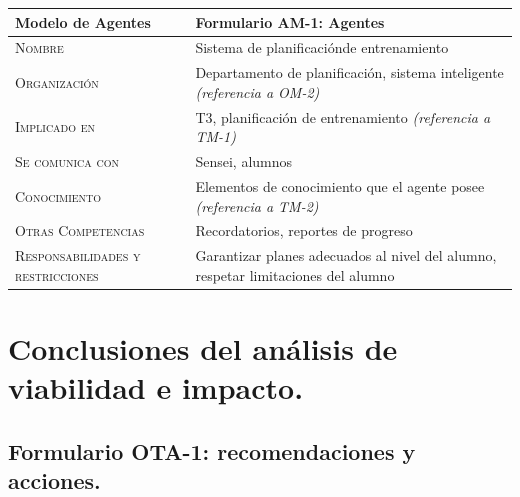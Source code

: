 \documentclass[12pt,a4paper,twoside,spanish]{article}      %
\begin{document}
        \begin{table}[H]
            \scriptsize
            \begin{tabularx}{\textwidth}{|l|X|} \hline
                \textbf{Modelo de Agentes} & \textbf{Formulario AM-1: Agentes} \\ \hline\hline
                
                \textsc{Nombre} &  Sistema de planificaciónde entrenamiento \\ \hline
                
                \textsc{Organización} &  Departamento de planificación, sistema inteligente \emph{(referencia a OM-2)}\\ \hline
                
                \textsc{Implicado en} & T3, planificación de entrenamiento \emph{(referencia a TM-1)} \\ \hline
                
                \textsc{Se comunica con} &  Sensei, alumnos  \\ \hline
                
                \textsc{Conocimiento} &  Elementos de conocimiento que el agente posee \emph{(referencia a TM-2)} \\ \hline
                
                \textsc{Otras Competencias} &  Recordatorios, reportes de progreso \\ \hline
                
                \textsc{Responsabilidades y restricciones} &  Garantizar planes adecuados al nivel del alumno, respetar limitaciones del alumno\\ \hline
            \end{tabularx}
             \label{tab.AM1}
        \end{table}
        
        
        \pagebreak
        
    \section{Conclusiones del análisis de viabilidad e impacto.}
    
        \subsection{Formulario OTA-1: recomendaciones y acciones.}
               
\end{document}
